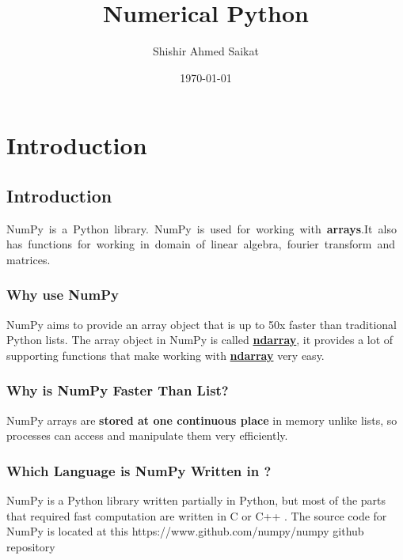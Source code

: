 \documentclass[openany]{book}
\title{Numerical Python}
\author{Shishir Ahmed Saikat}
\date{\today}
\begin{document}
\frontmatter %

\maketitle{}
\tableofcontents

\mainmatter %


\chapter{Introduction}
\section{Introduction}
\hbox{NumPy is a Python library.
NumPy is used for working with \textbf{arrays}. \\
It also has functions for working in domain of linear algebra, fourier transform and matrices.\\
}

\subsection{Why use NumPy}
NumPy aims to provide an array object that is up to 50x faster than traditional Python lists. The array object in NumPy is called \textbf{\underline{ndarray}}, it provides a lot of supporting functions that make working with \textbf{\underline{ndarray}} very easy. 

\subsection{Why is NumPy Faster Than List?}

NumPy arrays are \textbf{stored at one continuous place} in memory unlike lists, so processes can access and manipulate them very efficiently.

\subsection{Which Language is NumPy Written in ?}

NumPy is a Python library written partially in Python, but most of the parts that required fast computation are written in C or C++ . The source code for NumPy is located at this {https://www.github.com/numpy/numpy} github repository
\end{document}

